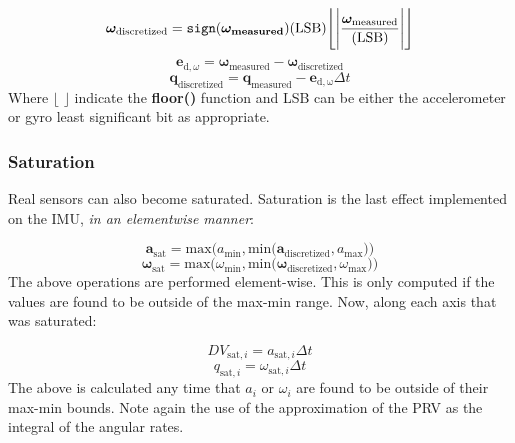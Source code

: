 \begin{equation}
\bm{\omega}_{\mathrm{discretized}} = \verb|sign|(\bm{\bm{\omega}_\mathrm{measured}})(\mathrm{LSB})\Biggl\lfloor\Biggl|\frac{\bm{\omega}_{\mathrm{measured}}}{(\mathrm{LSB})}\Biggr|\Biggr\rfloor
\end{equation}
\begin{equation}
\mathbf{e}_{\mathrm{d},\omega} =\bm{\omega}_{\mathrm{measured}} - \bm{\omega}_{\mathrm{discretized}}
\end{equation}
\begin{equation}
\mathbf{q}_{\mathrm{discretized}} = \mathbf{q}_{\mathrm{measured}} - \mathbf{e}_{\mathrm{d},\mathrm{\omega}}\Delta t
\end{equation}
Where $\lfloor$  $\rfloor$ indicate the \textbf{floor()} function and LSB can be either the accelerometer or gyro least significant bit as appropriate.

\subsubsection{Saturation}
Real sensors can also become saturated. Saturation is the last effect implemented on the IMU, \textit{in an elementwise manner}:

\begin{equation}
	\bm{a}_{\mathrm{sat}} = \mathrm{max}\big(a_{\mathrm{min}}, \mathrm{min}\big(    \bm{a}_{\mathrm{discretized}}, a_{\mathrm{max}}    \big)   \big)
\end{equation}
\begin{equation}
\bm{\omega}_{\mathrm{sat}} = \mathrm{max}\big(\omega_{\mathrm{min}}, \mathrm{min}\big(    \bm{\omega}_{\mathrm{discretized}}, \omega_{\mathrm{max}}    \big)   \big)
\end{equation}
The above operations are performed element-wise. This is only computed if the values are found to be outside of the max-min range. Now, along each axis that was saturated:

\begin{equation}
	DV_{\mathrm{sat},i} = a_{\mathrm{sat},i} \Delta t
\end{equation}
\begin{equation}
q_{\mathrm{sat},i} = \omega_{\mathrm{sat},i}  \Delta t
\end{equation}
The above is calculated any time that $a_i$ or $\omega_i$ are found to be outside of their max-min bounds. Note again the use of the approximation of the PRV as the integral of the angular rates.
